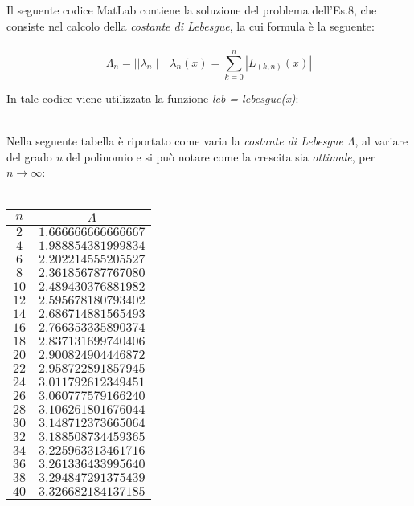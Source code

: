 Il seguente codice MatLab contiene la soluzione del problema dell'Es.8, che consiste nel calcolo della \textit{costante di Lebesgue}, la cui formula è la seguente:\\\
	\[
		\Lambda_n = ||\lambda_n|| \quad \lambda_n(x) = \sum_{k=0}^{n} |L_{(k,n)}(x)|
	\]
	
In tale codice viene utilizzata la funzione \textit{leb = lebesgue(x)}:\\\
	
Nella seguente tabella è riportato come varia la \textit{costante di Lebesgue} $\Lambda$, al variare del grado \textit{n} del polinomio e si può notare come la crescita sia \textit{ottimale}, per $n\rightarrow\infty$:\\\
	\begin{center}
		\begin{tabular}{|c|c|}
			\hline
				$n$ & $\Lambda$ \\
    		\hline
    			$2$  & $1.666666666666667$ \\ 
    			$4$  & $1.988854381999834$ \\ 
    			$6$  & $2.202214555205527$ \\ 
    			$8$  & $2.361856787767080$ \\ 
    			$10$ & $2.489430376881982$ \\ 
    			$12$ & $2.595678180793402$ \\ 
    			$14$ & $2.686714881565493$ \\ 
    			$16$ & $2.766353335890374$ \\ 
   				$18$ & $2.837131699740406$ \\ 
    			$20$ & $2.900824904446872$ \\ 
    			$22$ & $2.958722891857945$ \\ 
    			$24$ & $3.011792612349451$ \\ 
    			$26$ & $3.060777579166240$ \\ 
    			$28$ & $3.106261801676044$ \\ 
    			$30$ & $3.148712373665064$ \\ 
    			$32$ & $3.188508734459365$ \\ 
    			$34$ & $3.225963313461716$ \\ 
    			$36$ & $3.261336433995640$ \\ 
    			$38$ & $3.294847291375439$ \\ 
    			$40$ & $3.326682184137185$ \\ 
			\hline
		\end{tabular}
	\end{center}
